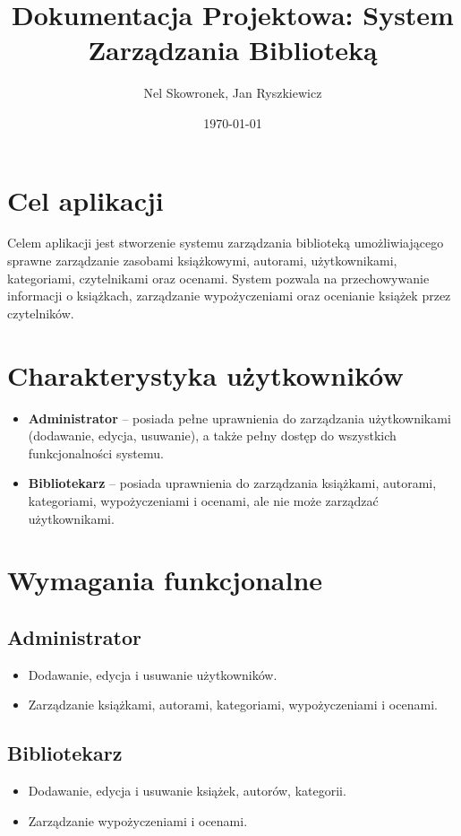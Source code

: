 \documentclass{article}
\title{Dokumentacja Projektowa: System Zarządzania Biblioteką}
\author{Nel Skowronek, Jan Ryszkiewicz}
\date{\today}
\begin{document}
\maketitle

\section{Cel aplikacji}
Celem aplikacji jest stworzenie systemu zarządzania biblioteką umożliwiającego sprawne zarządzanie zasobami książkowymi, autorami, użytkownikami, kategoriami, czytelnikami oraz ocenami. System pozwala na przechowywanie informacji o książkach, zarządzanie wypożyczeniami oraz ocenianie książek przez czytelników.

\section*{Charakterystyka użytkowników}
\begin{itemize}
    \item \textbf{Administrator} – posiada pełne uprawnienia do zarządzania użytkownikami (dodawanie, edycja, usuwanie), a także pełny dostęp do wszystkich funkcjonalności systemu.
    \item \textbf{Bibliotekarz} – posiada uprawnienia do zarządzania książkami, autorami, kategoriami, wypożyczeniami i ocenami, ale nie może zarządzać użytkownikami.
\end{itemize}

\section*{Wymagania funkcjonalne}
\subsection*{Administrator}
\begin{itemize}
    \item Dodawanie, edycja i usuwanie użytkowników.
    \item Zarządzanie książkami, autorami, kategoriami, wypożyczeniami i ocenami.
\end{itemize}

\subsection*{Bibliotekarz}
\begin{itemize}
    \item Dodawanie, edycja i usuwanie książek, autorów, kategorii.
    \item Zarządzanie wypożyczeniami i ocenami.
\end{itemize}
\end{document}
